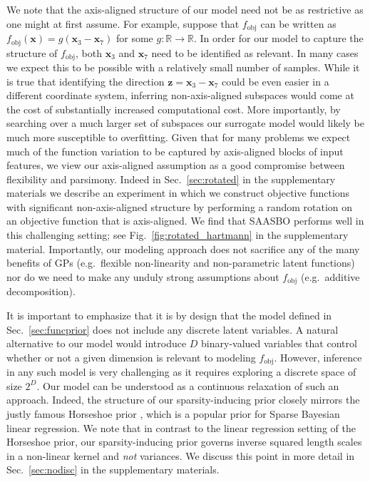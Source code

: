 \documentclass[accepted]{uai2021} %
\newcommand{\fobj}{f_{\text{obj}}}
\newcommand{\bx}{\mathbf{x}}
\newcommand{\bz}{\mathbf{z}}
\begin{document}
We note that the axis-aligned structure of our model need not be as restrictive as one might at first assume.
For example, suppose that $\fobj$ can be written as $\fobj(\bx) = g(\bx_3 - \bx_7)$ for some $g: \mathbb{R} \to  \mathbb{R}$.
In order for our model to capture the structure of $\fobj$, both $\bx_3$ and $\bx_7$ need to be identified
as relevant. %
In many cases we expect this to be possible with a relatively small number of samples. While it is true that
identifying the direction $\bz = \bx_3 - \bx_7$ could be even easier in a different coordinate system, inferring
non-axis-aligned subspaces would come at the cost of substantially increased computational cost. More importantly,
by searching over a much larger set of subspaces our surrogate model would likely be much more susceptible to overfitting.
Given that for many problems we expect much of the function variation to be captured by axis-aligned blocks
of input features, we view our axis-aligned assumption as a good compromise between flexibility and parsimony.
Indeed in Sec.~\ref{sec:rotated} in the supplementary materials we describe an experiment in which we construct
objective functions with significant non-axis-aligned structure by performing a random rotation on an objective function
that is axis-aligned.
We find that SAASBO performs well in this challenging setting; see Fig.~\ref{fig:rotated_hartmann} in the supplementary material.
Importantly, our modeling approach does not sacrifice any of the many benefits of GPs (e.g.~flexible non-linearity
and non-parametric latent functions) nor do we need to make any unduly strong assumptions about $\fobj$ (e.g.~additive decomposition).

It is important to emphasize that it is by design that the model defined in Sec.~\ref{sec:funcprior} does not include any discrete latent variables.
A natural alternative to our model would introduce $D$ binary-valued variables that control whether or not a given dimension is relevant to modeling $\fobj$.
However, inference in any such model is very challenging as it requires exploring a discrete space of size $2^D$.
Our model can be understood as a continuous relaxation of such an approach.
Indeed, the structure of our sparsity-inducing prior closely mirrors the justly famous
Horseshoe prior \citep{carvalho2009handling}, which is a popular prior for Sparse Bayesian linear regression.
We note that in contrast to the linear regression setting of the Horseshoe prior,
our sparsity-inducing prior governs inverse squared length scales in a non-linear kernel and \emph{not} variances.
We discuss this point in more detail in Sec.~\ref{sec:nodisc} in the supplementary materials.
\end{document}
